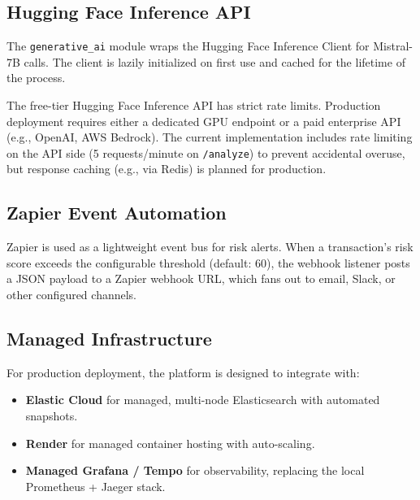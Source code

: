 \documentclass[11pt,a4paper]{article}
\begin{document}
\subsection{Hugging Face Inference API}
\label{subsec:hf}

The \texttt{generative\_ai} module wraps the Hugging Face Inference Client for Mistral-7B calls. The client is lazily initialized on first use and cached for the lifetime of the process.

\begin{warningbox}
The free-tier Hugging Face Inference API has strict rate limits. Production deployment requires either a dedicated GPU endpoint or a paid enterprise API (e.g., OpenAI, AWS Bedrock). The current implementation includes rate limiting on the API side (5 requests/minute on \texttt{/analyze}) to prevent accidental overuse, but response caching (e.g., via Redis) is planned for production.
\end{warningbox}

\subsection{Zapier Event Automation}
\label{subsec:zapier}

Zapier is used as a lightweight event bus for risk alerts. When a transaction's risk score exceeds the configurable threshold (default: 60), the webhook listener posts a JSON payload to a Zapier webhook URL, which fans out to email, Slack, or other configured channels.

\subsection{Managed Infrastructure}
\label{subsec:managed}

For production deployment, the platform is designed to integrate with:
\begin{itemize}[leftmargin=*]
  \item \textbf{Elastic Cloud} for managed, multi-node Elasticsearch with automated snapshots.
  \item \textbf{Render} for managed container hosting with auto-scaling.
  \item \textbf{Managed Grafana / Tempo} for observability, replacing the local Prometheus + Jaeger stack.
\end{itemize}

\end{document}
